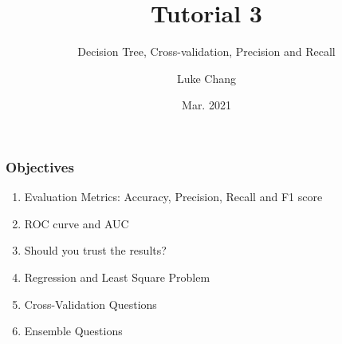 \documentclass[aspectratio=169, 10pt]{beamer}
\title{Tutorial 3}
\subtitle{Decision Tree, Cross-validation, Precision and Recall}
\author{Luke Chang}
\institute{The University of Auckland}
\date{Mar. 2021}
\begin{document}
\frame{\titlepage}

\begin{frame}
    \frametitle{Objectives}
    
    \begin{enumerate}
        \item Evaluation Metrics: Accuracy, Precision, Recall and F1 score
        \item ROC curve and AUC
        \item Should you trust the results?
        \item Regression and Least Square Problem
        \item Cross-Validation Questions
        \item Ensemble Questions
    \end{enumerate}
    
\end{frame}
\end{document}
